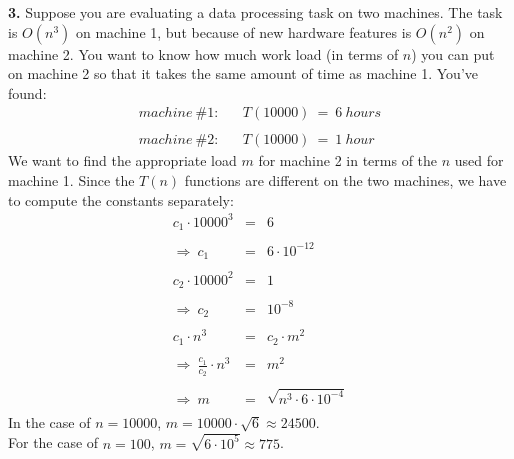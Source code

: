 {\bf{3.}} Suppose you are evaluating a data processing task on
two machines. The task is $O(n^3)$ on machine 1, but because
of new hardware features is $O(n^2)$ on machine 2.
You want to know how much work load (in terms of $n$) you can
put on machine 2 so that it takes the same amount of time as
machine 1. You've found:
\begin{eqnarray*}
{\mathit{machine\ \#1:}} & & T(10000) \ = \ 6 \ {\mathit{hours}} \\
& & \\
{\mathit{machine\ \#2:}} & & T(10000) \ = \ 1 \ {\mathit{hour}}
\end{eqnarray*}
We want to find the appropriate load $m$ for
machine 2 in terms of the $n$ used for machine 1. Since the $T(n)$ functions
are different on the two machines, we have to
%
compute the constants
separately:
\begin{eqnarray*}
c_1{\cdot}{10000}^3 & = & 6 \\
& & \\
\Rightarrow \ c_1 & = & 6{\cdot}10^{-12} \\
& & \\
c_2{\cdot}{10000}^2 & = & 1 \\
& & \\
\Rightarrow \ c_2 & = & 10^{-8} \\
& & \\
c_1{\cdot}{n}^3 & = & c_2{\cdot}{m}^2 \\
& & \\
\Rightarrow \ \frac{c_1}{c_2}{\cdot}n^3 & = & m^2 \\
& & \\
\Rightarrow \ m & = & \sqrt{n^3{\cdot}6{\cdot}10^{-4}} \\
\end{eqnarray*}
In the case of $n = 10000$, $m = 10000{\cdot}\sqrt{6} \approx 24500$. \\
For the case of $n = 100$, $m = \sqrt{6{\cdot}10^5} \approx 775$.

